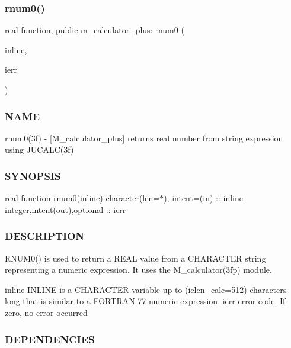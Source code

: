 \subsubsection{\texorpdfstring{rnum0()}{rnum0()}}
{\footnotesize\ttfamily \hyperlink{read__watch_83_8txt_abdb62bde002f38ef75f810d3a905a823}{real} function, \hyperlink{M__stopwatch_83_8txt_a2f74811300c361e53b430611a7d1769f}{public} m\+\_\+calculator\+\_\+plus\+::rnum0 (\begin{DoxyParamCaption}\item[{\hyperlink{option__stopwatch_83_8txt_abd4b21fbbd175834027b5224bfe97e66}{character}(len=$\ast$), intent(\hyperlink{M__journal_83_8txt_afce72651d1eed785a2132bee863b2f38}{in})}]{inline,  }\item[{integer, intent(out), \hyperlink{option__stopwatch_83_8txt_aa4ece75e7acf58a4843f70fe18c3ade5}{optional}}]{ierr }\end{DoxyParamCaption})}



\subsubsection*{N\+A\+ME}

rnum0(3f) -\/ \mbox{[}M\+\_\+calculator\+\_\+plus\mbox{]} returns real number from string expression using J\+U\+C\+A\+L\+C(3f) \subsubsection*{S\+Y\+N\+O\+P\+S\+IS}

real function rnum0(inline) character(len=$\ast$), intent=(in) \+:\+: inline integer,intent(out),optional \+:\+: ierr

\subsubsection*{D\+E\+S\+C\+R\+I\+P\+T\+I\+ON}

R\+N\+U\+M0() is used to return a R\+E\+AL value from a C\+H\+A\+R\+A\+C\+T\+ER string representing a numeric expression. It uses the M\+\_\+calculator(3fp) module.

inline I\+N\+L\+I\+NE is a C\+H\+A\+R\+A\+C\+T\+ER variable up to (iclen\+\_\+calc=512) characters long that is similar to a F\+O\+R\+T\+R\+AN 77 numeric expression. ierr error code. If zero, no error occurred

\subsubsection*{D\+E\+P\+E\+N\+D\+E\+N\+C\+I\+ES}

